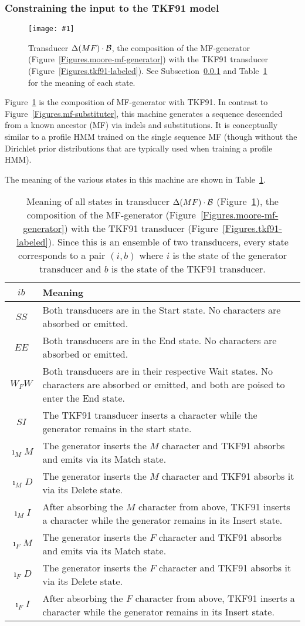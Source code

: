 \documentclass{article}
\newcommand{\secref}[1]{Subsection~\ref{sec.#1}}
\newcommand{\seclabel}[1]{\label{sec.#1}}
\newcommand{\tabnum}[1]{\ref{tab.#1}}
\newcommand{\tabref}[1]{Table~\tabnum{#1}}
\newcommand{\tablabel}[1]{\label{tab.#1}}
\newcommand{\figref}[1]{Figure~\ref{Figures.#1}}
\newcommand{\figlabel}[1]{\label{Figures.#1}}
\newcommand{\easyfig}[4]{
\begin{figure}
\texttt{[image: \#1]}
\caption{ \figlabel{#3} #4}
\end{figure}}
\newcommand{\tallpdffig}[2]{\easyfig{#1-fig.pdf}{height=.8\textheight}{#1}{#2}}
\newcommand\tkf{{\cal B}}
\newcommand\generate{\Delta}
\begin{document}
\subsubsection{Constraining the input to the TKF91 model}
\seclabel{mf-tkf91}
\tallpdffig{mf-tkf91}{Transducer $\generate(MF) \cdot \tkf$, the composition of the MF-generator (\figref{moore-mf-generator}) with the TKF91 transducer (\figref{tkf91-labeled}).  See \secref{mf-tkf91} and \tabref{mf-tkf91} for the meaning of each state. }

\figref{mf-tkf91} is the composition of MF-generator with TKF91.  
In contrast to \figref{mf-substituter}, this machine generates
a sequence descended from a known ancestor (MF) via indels and substitutions.  It is conceptually similar to a profile HMM
trained on the single sequence MF (though without the Dirichlet prior distributions that are typically used when training a profile HMM).

The meaning of the various states in this machine are shown in \tabref{mf-tkf91}.

\begin{table}
\begin{tabular}{c|p{}}
$i b$ & Meaning \\
\hline
$SS$ & Both transducers are in the Start state.  No characters are  absorbed or emitted. \\
$EE$ & Both transducers are in the End state.  No characters are  absorbed or emitted. \\
$W_FW$ & Both transducers are in their respective Wait states.  No characters are absorbed or emitted, and both are poised to enter the End state.  \\
$SI$ & The TKF91 transducer inserts a character while the generator remains in the start state.  \\
$\imath_MM$ & The  generator inserts the $M$ character and TKF91 absorbs and emits via its Match state. \\
$\imath_MD$ & The  generator inserts the $M$ character and TKF91 absorbs it via its Delete state. \\
$\imath_MI$ & After absorbing the $M$ character from above, TKF91 inserts a character while the generator remains in its Insert state.  \\
$\imath_FM$ & The  generator inserts the $F$ character and TKF91 absorbs and emits via its Match state. \\
$\imath_FD$ & The  generator inserts the $F$ character and TKF91 absorbs it via its Delete state. \\
$\imath_FI$ & After absorbing the $F$ character from above, TKF91 inserts a character while the generator remains in its Insert state.  \\
\end{tabular}
\caption{ \tablabel{mf-tkf91} Meaning of all states in
transducer $\generate(MF) \cdot \tkf$ (\figref{mf-tkf91}),
the composition of the MF-generator (\figref{moore-mf-generator})
with the TKF91 transducer (\figref{tkf91-labeled}).
Since this is an ensemble of two transducers, every state corresponds to a pair $(i,b)$
where
$i$ is the state of the generator transducer and
$b$ is the state of the TKF91 transducer.
 }
\end{table}
\end{document}
